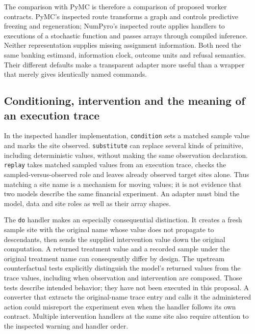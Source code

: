 The comparison with PyMC is therefore a comparison of proposed worker contracts. PyMC's inspected route transforms a graph and controls predictive freezing and regeneration; NumPyro's inspected route applies handlers to executions of a stochastic function and passes arrays through compiled inference. Neither representation supplies missing assignment information. Both need the same banking estimand, information clock, outcome units and refusal semantics. Their different defaults make a transparent adapter more useful than a wrapper that merely gives identically named commands. \citep{exec23_pymc_sources,exec23_numpyro_sources}

\subsection{Conditioning, intervention and the meaning of an execution trace}

In the inspected handler implementation, \texttt{condition} sets a matched sample value and marks the site observed. \texttt{substitute} can replace several kinds of primitive, including deterministic values, without making the same observation declaration. \texttt{replay} takes matched sampled values from an execution trace, checks the sampled-versus-observed role and leaves already observed target sites alone. Thus matching a site name is a mechanism for moving values; it is not evidence that two models describe the same financial experiment. An adapter must bind the model, data and site roles as well as their array shapes. \citep{exec23_numpyro_sources}

The \texttt{do} handler makes an especially consequential distinction. It creates a fresh sample site with the original name whose value does not propagate to descendants, then sends the supplied intervention value down the original computation. A returned treatment value and a recorded sample under the original treatment name can consequently differ by design. The upstream counterfactual tests explicitly distinguish the model's returned values from the trace values, including when observation and intervention are composed. Those tests describe intended behavior; they have not been executed in this proposal. A converter that extracts the original-name trace entry and calls it the administered action could misreport the experiment even when the handler follows its own contract. Multiple intervention handlers at the same site also require attention to the inspected warning and handler order. \citep{exec23_numpyro_sources}

